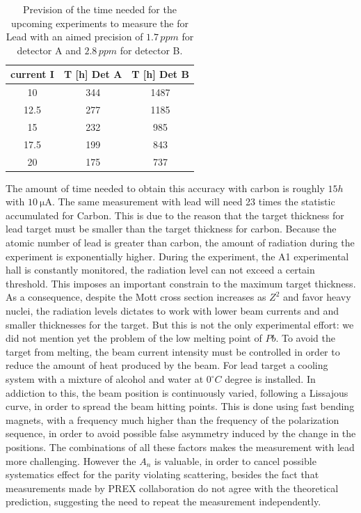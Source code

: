 \begin{table}[ht]
\centering
\begin{tabular}{c|c|c}
\hline
   current I &   T [h] Det A &   T [h] Det B \\
\hline
        10   &       344 &      1487  \\
        12.5 &       277 &      1185   \\
        15   &       232 &      985 \\
        17.5 &       199 &      843 \\
        20   &       175 &      737 \\
\hline
\end{tabular}
\caption{Prevision of the time needed for the upcoming experiments to measure the \transv for Lead with an aimed precision of $1.7 \, ppm$ for detector A and $2.8 \, ppm$ for detector B.}
\end{table}

The amount of time needed to obtain this accuracy with carbon is roughly $15 h$ with $\SI{10}{\micro \ampere}$. The same measurement with lead will need 23 times the statistic accumulated for Carbon. This is due to the reason that the target thickness for lead target must be smaller than the target thickness for carbon. Because the atomic number of lead is greater than carbon, the amount of radiation during the experiment is exponentially higher. During the experiment, the A1 experimental hall is constantly monitored, the radiation level can not exceed a certain threshold. This imposes an important constrain to the maximum target thickness. As a consequence, despite the Mott cross section increases as $Z^{2}$ and favor heavy nuclei, the radiation levels dictates to work with lower beam currents and and smaller thicknesses for the target. But this is not the only experimental effort: we did not mention yet the problem of the low melting point of $Pb$. To avoid the target from melting, the beam current intensity must be controlled in order to reduce the amount of heat produced by the beam. For lead target a cooling system with a mixture of alcohol and water at $0^{\circ} C$  degree is installed. In addiction to this, the beam position is continuously varied, following a Lissajous curve, in order to spread the beam hitting points. This is done using fast bending magnets, with a frequency much higher than the frequency of the polarization sequence, in order to avoid possible false asymmetry induced by the change in the positions. The combinations of all these factors makes the measurement with lead more challenging. However the $A_{n}$ is valuable, in order to cancel possible systematics effect for the parity violating scattering, besides the fact that measurements made by PREX collaboration \cite{HAPPEX:2012fud} do not agree with the theoretical prediction, suggesting the need to repeat the measurement independently. 
 
